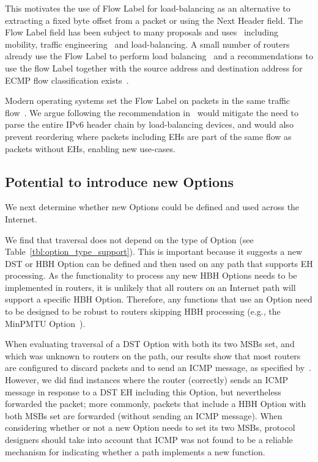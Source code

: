\documentclass[conference]{IEEEtran}
\begin{document}
This motivates the use of Flow Label for load-balancing as an alternative to extracting a fixed byte offset from a packet or using the Next Header field. The Flow Label field has been subject to many proposals and uses~\cite{flow-label-approaches} including mobility, traffic engineering~\cite{traffic-eng} and load-balancing. A small number of routers already use the Flow Label to perform load balancing~\cite{lb-classification} and a recommendations to use the flow Label together with the source address and destination address for ECMP flow classification exists~\cite{RFC6437}.


Modern operating systems set the Flow Label on packets in the same traffic flow~\cite{os-fl}. We argue following the recommendation in~\cite{RFC6437} would mitigate the need to parse the entire IPv6 header chain by load-balancing devices, and would also prevent reordering where packets including EHs are part of the same flow as packets without EHs, enabling new use-cases. 



\subsection{Potential to introduce new Options}

We next determine whether new Options could be defined and used across the Internet.

We find that traversal does not depend on the type of Option  (see Table~\ref{tbl:option_type_support}). This is important because it suggests a new DST or HBH Option can be defined and then used on any path that supports EH processing. 
As the functionality to process any new HBH Options needs to be implemented in routers, it is unlikely that all routers on an Internet path will support a specific HBH Option. Therefore, any functions that use an Option need to be designed to be robust to routers skipping HBH processing (e.g., the MinPMTU  Option~\cite{rfc9268,rfc9343}). 

When evaluating traversal of a DST Option with both its two MSBs set, and which was unknown to routers on the path, our results show that most routers are configured to discard packets and to send an ICMP message, as specified by~\cite{RFC4443}. However, we did find instances where the router (correctly) sends an ICMP message in response to a DST EH including this Option, but nevertheless forwarded the packet; more commonly, packets that include a HBH Option with both MSBs set are forwarded (without sending an ICMP message). When considering whether or not a new Option needs to set its two MSBs, protocol designers should take into account that ICMP was not found to be a reliable mechanism for indicating whether a path implements a new function.
\end{document}
